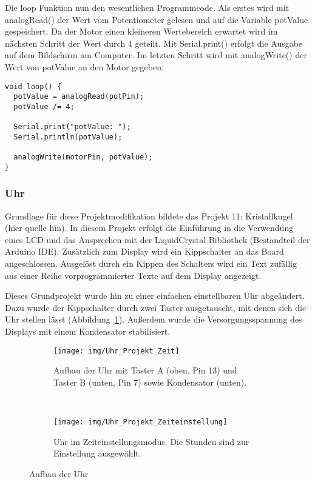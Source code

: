 Die loop Funktion nun den wesentlichen Programmcode. Als erstes wird mit analogRead() der Wert vom Potentiometer gelesen und auf die Variable potValue gespeichert. Da der Motor einen kleineren Wertebereich erwartet wird im nächsten Schritt der Wert durch 4 geteilt. Mit Serial.print() erfolgt die Ausgabe auf dem Bildschirm am Computer. Im letzten Schritt wird mit analogWrite() der Wert von potValue an den Motor gegeben.
\begin{lstlisting}[language=Arduino]
void loop() {
  potValue = analogRead(potPin);
  potValue /= 4;

  Serial.print("potValue: ");
  Serial.println(potValue);

  analogWrite(motorPin, potValue);
}
\end{lstlisting}



\subsubsection{Uhr}
Grundlage für diese Projektmodifikation bildete das Projekt 11: Kristallkugel (hier quelle hin). In diesem Projekt erfolgt die Einführung in die Verwendung eines LCD und das Ansprechen mit der LiquidCrystal-Bibliothek (Bestandteil der Arduino IDE).
Zusätzlich zum Display wird ein Kippschalter an das Board angeschlossen. Ausgelöst durch ein Kippen des Schalters wird ein Text zufällig aus einer Reihe vorprogrammierter Texte auf dem Display angezeigt.

Dieses Grundprojekt wurde hin zu einer einfachen einstellbaren Uhr abgeändert. Dazu wurde der Kippschalter durch zwei Taster ausgetauscht, mit denen sich die Uhr stellen lässt (Abbildung~\ref{fig:zeit}). Außerdem wurde die Versorgungsspannung des Displays mit einem Kondensator stabilisiert.

\begin{figure}[p]
    \centering
    \begin{subfigure}[b]{0.6\linewidth}
        \centering
        \texttt{[image: img/Uhr\_Projekt\_Zeit]}
        \caption{Aufbau der Uhr mit Taster A (oben, Pin 13) und Taster B (unten, Pin 7) sowie Kondensator (unten).}\label{fig:zeit}
    \end{subfigure}\enspace%
    \\
    \begin{subfigure}[b]{0.6\linewidth}
        \centering
        \texttt{[image: img/Uhr\_Projekt\_Zeiteinstellung]}
        \caption{Uhr im Zeiteinstellungsmodus. Die Stunden sind zur Einstellung ausgewählt.}\label{fig:zeiteinstell}
    \end{subfigure}
    \caption{Aufbau der Uhr}\label{fig:uhr}
\end{figure}

